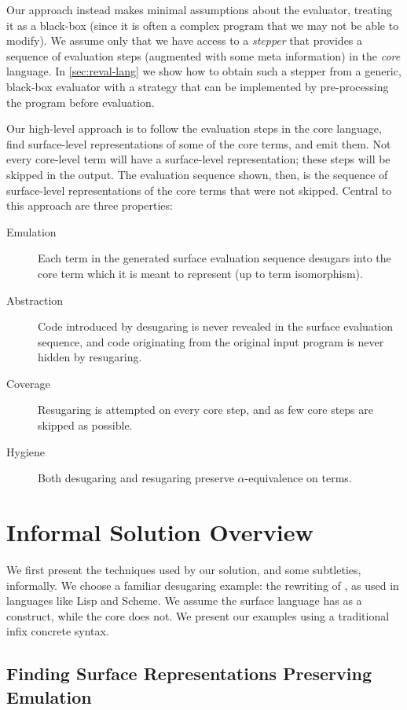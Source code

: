 Our approach instead makes minimal assumptions about the
evaluator, treating it as a black-box (since it is often a complex
program that we may not be able to modify).
We assume only that we have access to a \emph{stepper} that
provides a sequence of evaluation steps (augmented with some
meta information) in the \emph{core} language. In 
\cref{sec:reval-lang} we show how to obtain such a stepper from a generic,
black-box
evaluator with a strategy that can be implemented by pre-processing
the program before evaluation.

Our high-level approach is to follow the evaluation steps in the core
language, find surface-level representations of some of the core
terms, and emit them. Not every core-level term will have a
surface-level representation; these steps will be skipped in the
output. The evaluation sequence shown, then, is the sequence of
surface-level representations of the core terms that were not
skipped. Central to this approach are three properties:

\begin{description}
\item[Emulation] Each term in the generated surface evaluation
  sequence desugars into the core term which it is meant to represent
  (up to term isomorphism).
\item[Abstraction] Code introduced by desugaring is never revealed in the
  surface evaluation sequence, and code originating from the original
  input program is never hidden by resugaring.
\item[Coverage] Resugaring is attempted on every core step, and as few
  core steps are skipped as possible.
\item[Hygiene] Both desugaring and resugaring preserve
  $\alpha$-equivalence on terms.
\end{description}

\section{Informal Solution Overview}
\label{sec:reval-exposition}

We first present the techniques used by our solution, and some subtleties,
informally. We choose a familiar desugaring example: the rewriting
of , as used in languages like Lisp and Scheme. We assume
the surface language has  as a construct, while the core does
not. We present our examples using a traditional infix concrete syntax.

\subsection{Finding Surface Representations Preserving Emulation}

